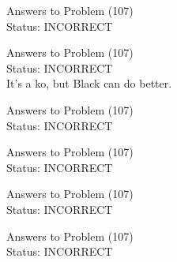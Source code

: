 \documentclass[11pt]{article}
\begin{document}
\begin{minipage}[t]{0.5\textwidth}
  {\centering
  
  Answers to Problem (107)\\
  Status: INCORRECT\\
  
  }
\end{minipage}
\begin{minipage}[t]{0.5\textwidth}
  {\centering
  
  Answers to Problem (107)\\
  Status: INCORRECT\\
  It's a ko, but Black can do better.\\
  }
\end{minipage}
\begin{minipage}[t]{0.5\textwidth}
  {\centering
  
  Answers to Problem (107)\\
  Status: INCORRECT\\
  
  }
\end{minipage}
\begin{minipage}[t]{0.5\textwidth}
  {\centering
  
  Answers to Problem (107)\\
  Status: INCORRECT\\
  
  }
\end{minipage}
\begin{minipage}[t]{0.5\textwidth}
  {\centering
  
  Answers to Problem (107)\\
  Status: INCORRECT\\
  
  }
\end{minipage}
\begin{minipage}[t]{0.5\textwidth}
  {\centering
  
  Answers to Problem (107)\\
  Status: INCORRECT\\
  
  }
\end{minipage}
\end{document}
